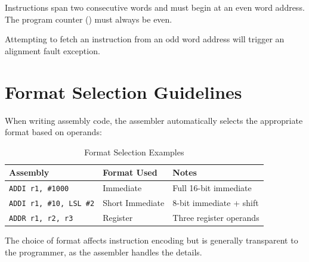 Instructions span two consecutive words and must begin at an even word address. The program counter () must
always be even.

Attempting to fetch an instruction from an odd word address will trigger an alignment fault exception.

\section{Format Selection Guidelines}

When writing assembly code, the assembler automatically selects the appropriate format based on operands:

\begin{table}[H]
	\centering
	\small
	\begin{tabular}{lll}
		\toprule
		\textbf{Assembly}               & \textbf{Format Used} & \textbf{Notes}          \\
		\midrule
		\texttt{ADDI r1, \#1000}        & Immediate            & Full 16-bit immediate   \\
		\texttt{ADDI r1, \#10, LSL \#2} & Short Immediate      & 8-bit immediate + shift \\
		\texttt{ADDR r1, r2, r3}        & Register             & Three register operands \\
		\bottomrule
	\end{tabular}
	\caption{Format Selection Examples}
	\label{tab:format-selection}
\end{table}

The choice of format affects instruction encoding but is generally transparent to the programmer, as the assembler
handles the details.
